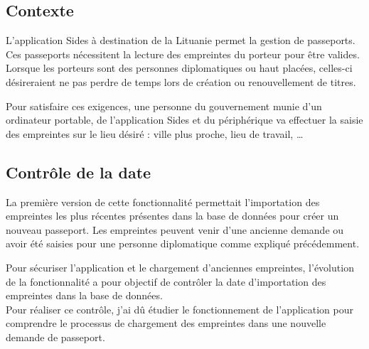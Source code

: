 \subsection{Contexte}

L'application Sides à destination de la Lituanie permet la gestion de passeports.
Ces passeports nécessitent la lecture des empreintes du porteur pour être valides.
Lorsque les porteurs sont des personnes diplomatiques ou haut placées, celles-ci désireraient ne pas perdre de temps lors de création ou renouvellement de titres.

Pour satisfaire ces exigences, une personne du gouvernement munie d'un ordinateur portable, de l'application Sides et du périphérique va effectuer la saisie des empreintes sur le lieu désiré : ville plus proche, lieu de travail, \ldots


\subsection{Contrôle de la date}

La première version de cette fonctionnalité permettait l'importation des empreintes les plus récentes présentes dans la base de données pour créer un nouveau passeport.
Les empreintes peuvent venir d'une ancienne demande ou avoir été saisies pour une personne diplomatique comme expliqué précédemment.

Pour sécuriser l'application et le chargement d'anciennes empreintes, l'évolution de la fonctionnalité a pour objectif de contrôler la date d'importation des empreintes dans la base de données.
\\

Pour réaliser ce contrôle, j'ai dû étudier le fonctionnement de l'application pour comprendre le processus de chargement des empreintes dans une nouvelle demande de passeport.


